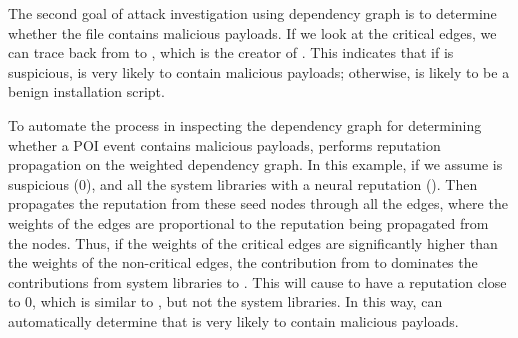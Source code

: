 The second goal of attack investigation using dependency graph is to determine whether the file  contains malicious payloads. 
If we look at the critical edges, we can trace back from  to , which is the creator of .
This indicates that if  is suspicious,  is very likely to contain malicious payloads; otherwise,  is likely to be a benign installation script.

To automate the process in inspecting the dependency graph for determining whether a POI event contains malicious payloads, \tool performs reputation propagation on the weighted dependency graph.
In this example, if we assume  is suspicious (\ie $0$), and all the system libraries with a neural reputation ().
Then \tool propagates the reputation from these seed nodes through all the edges, where the weights of the edges are proportional to the reputation being propagated from the nodes.
Thus, if the weights of the critical edges are significantly higher than the weights of the non-critical edges, the contribution from  to  dominates the contributions from system libraries to .
This will cause  to have a reputation close to 0, which is similar to , but not the system libraries.
In this way, \tool can automatically determine that  is very likely to contain malicious payloads.







